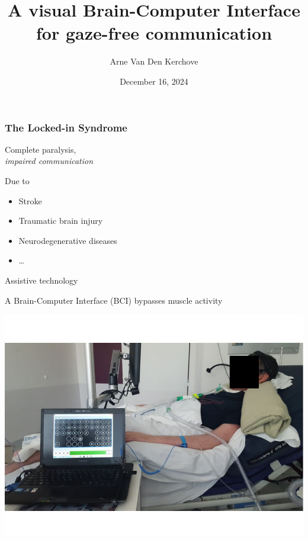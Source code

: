 \documentclass{kul-ulille-beamer}
\title{%
  A visual Brain-Computer Interface \\
  for gaze-free communication
}
\author{Arne Van Den Kerchove}
\date{December 16, 2024}
\begin{document}

\titleframe


\begin{frame}
  \frametitle{The Locked-in Syndrome}
  \centering
  \begin{minipage}[c]{.4\textwidth}
    \small
    \raggedright
    Complete paralysis, \\ \emph{impaired communication}
    \bigskip

    Due to
    \begin{itemize}
      \item Stroke
      \item Traumatic brain injury
      \item Neurodegenerative diseases
      \item \ldots
    \end{itemize}
    \bigskip

  Assistive technology
  \bigskip

  A Brain-Computer Interface (BCI) bypasses muscle activity

 \end{minipage}\hfill%
  \begin{minipage}[c]{.5\textwidth}
    \includegraphics[width=\textwidth]{figures/intro/damien.pdf}
  \end{minipage}
\end{frame}
\end{document}
